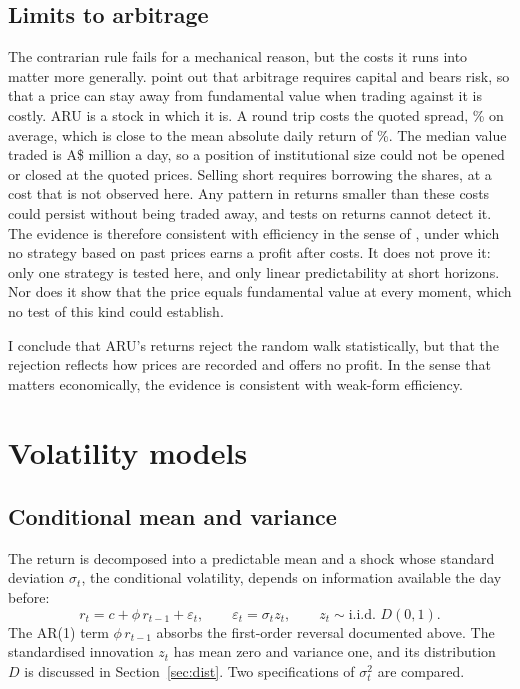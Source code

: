 \documentclass[11pt,a4paper]{article}
\begin{document}
\subsection{Limits to arbitrage}\label{sec:arb}

The contrarian rule fails for a mechanical reason, but the costs it runs into matter more generally. \citet{shleifervishny1997} point out that arbitrage requires capital and bears risk, so that a price can stay away from fundamental value when trading against it is costly. ARU is a stock in which it is. A round trip costs the quoted spread, \qSpread\% on average, which is close to the mean absolute daily return of \meanAbsRet\%. The median value traded is A\$\liqMedian{} million a day, so a position of institutional size could not be opened or closed at the quoted prices. Selling short requires borrowing the shares, at a cost that is not observed here. Any pattern in returns smaller than these costs could persist without being traded away, and tests on returns cannot detect it. The evidence is therefore consistent with efficiency in the sense of \citet{jensen1978}, under which no strategy based on past prices earns a profit after costs. It does not prove it: only one strategy is tested here, and only linear predictability at short horizons. Nor does it show that the price equals fundamental value at every moment, which no test of this kind could establish.

I conclude that ARU's returns reject the random walk statistically, but that the rejection reflects how prices are recorded and offers no profit. In the sense that matters economically, the evidence is consistent with weak-form efficiency.

\section{Volatility models}\label{sec:vol}

\subsection{Conditional mean and variance}

The return is decomposed into a predictable mean and a shock whose standard deviation $\sigma_t$, the conditional volatility, depends on information available the day before:
\begin{equation}\label{eq:mean}
r_t=c+\phi\,r_{t-1}+\varepsilon_t,\qquad \varepsilon_t=\sigma_t z_t,\qquad z_t\sim\text{i.i.d. } D(0,1).
\end{equation}
The AR(1) term $\phi\,r_{t-1}$ absorbs the first-order reversal documented above. The standardised innovation $z_t$ has mean zero and variance one, and its distribution $D$ is discussed in Section~\ref{sec:dist}. Two specifications of $\sigma_t^2$ are compared.
\end{document}
